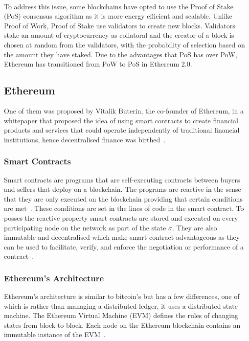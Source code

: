 \\[3mm]
To address this issue, some blockchains have opted to use the Proof of Stake (PoS) consensus algorithm as it is more energy efficient and scalable. Unlike Proof of Work, Proof of Stake use validators to create new blocks. Validators stake an amount of cryptocurrency as collatoral and the creator of a block is chosen at random from the validators, with the probability of selection based on the amount they have staked. Due to the advantages that PoS has over PoW, Ethereum has transitioned from PoW to PoS in Ethereum 2.0.

\subsection{Ethereum}
One of them was proposed by Vitalik Buterin, the co-founder of Ethereum, in a whitepaper that proposed the idea of using smart contracts to create financial products and services that could operate independently of traditional financial institutions, hence decentralised finance was birthed~\cite{buterin2014next}.

\subsubsection{Smart Contracts}
Smart contracts are programs that are self-executing contracts between buyers and sellers that deploy on a blockchain. The programs are reactive in the sense that they are only executed on the blockchain providing that certain conditions are met~\cite{noauthor_what_nodate}. These conditions are set in the lines of code in the smart contract. To posses the reactive property smart contracts are stored and executed on every participating node on the network as part of the state $\sigma$. They are also immutable and decentralised which make smart contract advantageous as they can be used to facilitate, verify, and enforce the negotiation or performance of a contract~\cite{noauthor_introduction_nodate, noauthor_smart_nodate}.

\subsubsection{Ethereum's Architecture}
Ethereum's architecture is similar to bitcoin's but has a few differences, one of which is rather than managing a distributed ledger, it uses a distributed state machine. The Ethereum Virtual Machine (EVM) defines the rules of changing states from block to block. Each node on the Ethereum blockchain contains an immutable instance of the EVM~\cite{noauthor_ethereum_nodate}.

